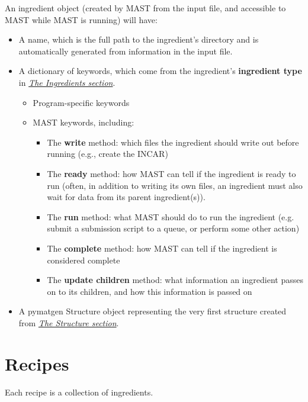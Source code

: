 \documentclass[letterpaper,10pt,english]{sphinxmanual}
\begin{document}
An ingredient object (created by MAST from the input file, and accessible to MAST while MAST is running) will have:
\begin{itemize}
\item {} 
A name, which is the full path to the ingredient's directory and is automatically generated from information in the input file.

\item {} 
A dictionary of keywords, which come from the ingredient's \textbf{ingredient type} in {\hyperref[3_1_2_ingredients::doc]{\emph{The Ingredients section}}}.
\begin{itemize}
\item {} 
Program-specific keywords

\item {} 
MAST keywords, including:
\begin{itemize}
\item {} 
The \textbf{write} method: which files the ingredient should write out before running (e.g., create the INCAR)

\item {} 
The \textbf{ready} method: how MAST can tell if the ingredient is ready to run (often, in addition to writing its own files, an ingredient must also wait for data from its parent ingredient(s)).

\item {} 
The \textbf{run} method: what MAST should do to run the ingredient (e.g. submit a submission script to a queue, or perform some other action)

\item {} 
The \textbf{complete} method: how MAST can tell if the ingredient is considered complete

\item {} 
The \textbf{update children} method: what information an ingredient passes on to its children, and how this information is passed on

\end{itemize}

\end{itemize}

\item {} 
A pymatgen Structure object representing the very first structure created from {\hyperref[3_1_1_structure::doc]{\emph{The Structure section}}}.

\end{itemize}


\chapter{Recipes}
\label{4_0_recipe:recipes}\label{4_0_recipe::doc}
Each recipe is a collection of ingredients.
\end{document}
